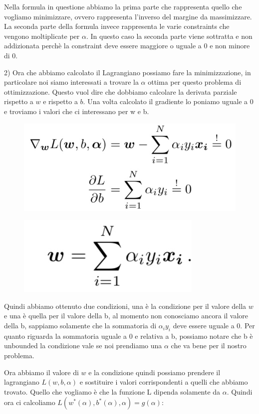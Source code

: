 \documentclass[14pt]{extreport}
\begin{document}
Nella formula in questione abbiamo la prima parte che rappresenta quello che vogliamo minimizzare, ovvero rappresenta l'inverso del margine da
massimizzare. La seconda parte della formula invece rappresenta le varie constraints che vengono moltiplicate per $\alpha$. In questo caso la seconda
parte viene sottratta e non addizionata perchè la constraint deve essere maggiore o uguale a 0 e non minore di 0.

2) Ora che abbiamo calcolato il Lagrangiano possiamo fare la minimizzazione, in particolare noi siamo interessati a trovare la $\alpha$ ottima per
questo problema di ottimizzazione. Questo vuol dire che dobbiamo calcolare la derivata parziale rispetto a $w$ e rispetto a $b$. Una volta calcolato
il gradiente lo poniamo uguale a 0 e troviamo i valori che ci interessano per w e b.

\begin{figure}[H]
\centering
\includegraphics[width=0.4\linewidth]{316.jpeg}
\end{figure}

\begin{figure}[H]
\centering
\includegraphics[width=0.3\linewidth]{317.jpeg}
\end{figure}

Quindi abbiamo ottenuto due condizioni, una è la condizione per il valore della $w$ e una è quella per il valore della b, al momento non conosciamo
ancora il valore della b, sappiamo solamente che la sommatoria di $\alpha_iy_i$ deve essere uguale a 0. Per quanto riguarda la sommatoria uguale a 0 e
relativa a b, possiamo notare che b è unbounded la condizione vale se noi prendiamo una $\alpha$ che va bene per il nostro problema.

Ora abbiamo il valore di $w$ e la condizione quindi possiamo prendere il lagrangiano $L(w,b,\alpha)$ e sostituire i valori corrispondenti a quelli che
abbiamo trovato. Quello che vogliamo è che la funzione L dipenda solamente da $\alpha$. Quindi ora ci calcoliamo $L(w^{*}(\alpha), b^{*}(\alpha),
\alpha) = g(\alpha)$:
\end{document}
